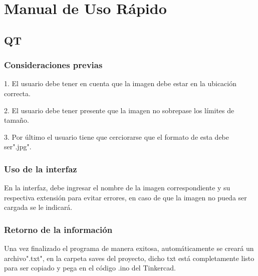 \documentclass{article}
\begin{document}
\section{Manual de Uso Rápido}
\label{manual}
    \begin{flushleft}
    \subsection{QT}
    \end{flushleft}
    \begin{flushleft}
    \subsubsection{Consideraciones previas}
    1. El usuario debe tener en cuenta que la imagen debe estar en la ubicación correcta.
    
    \vspace{0.1cm}
    
    2. El usuario debe tener presente que la imagen no sobrepase los límites de tamaño.
    
    \vspace{0.1cm}
    
    3. Por último el usuario tiene que cerciorarse que el formato de esta debe ser".jpg".
    \end{flushleft}
    
    \begin{flushleft}
    \subsubsection{Uso de la interfaz}
    En la interfaz, debe ingresar el nombre de la imagen correspondiente y su respectiva extensión para evitar errores, en caso de que la imagen no pueda ser cargada se le indicará. 
    \end{flushleft}
    \begin{flushleft}
    \subsubsection{Retorno de la información}
    Una vez finalizado el programa de manera exitosa, automáticamente se creará un archivo".txt", en la carpeta saves del proyecto, dicho txt está completamente listo para ser copiado y pega en el código .ino del Tinkercad.  
    \end{flushleft}
    
\end{document}
